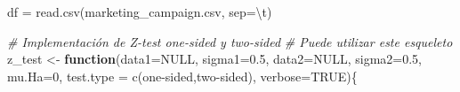 \documentclass[]{article}
\newenvironment{Shaded}{\begin{snugshade}}{\end{snugshade}}
\newcommand{\AttributeTok}[1]{\textcolor[rgb]{0.77,0.63,0.00}{#1}}
\newcommand{\CommentTok}[1]{\textcolor[rgb]{0.56,0.35,0.01}{\textit{#1}}}
\newcommand{\ConstantTok}[1]{\textcolor[rgb]{0.00,0.00,0.00}{#1}}
\newcommand{\ControlFlowTok}[1]{\textcolor[rgb]{0.13,0.29,0.53}{\textbf{#1}}}
\newcommand{\DecValTok}[1]{\textcolor[rgb]{0.00,0.00,0.81}{#1}}
\newcommand{\FloatTok}[1]{\textcolor[rgb]{0.00,0.00,0.81}{#1}}
\newcommand{\FunctionTok}[1]{\textcolor[rgb]{0.00,0.00,0.00}{#1}}
\newcommand{\NormalTok}[1]{#1}
\newcommand{\OtherTok}[1]{\textcolor[rgb]{0.56,0.35,0.01}{#1}}
\newcommand{\SpecialCharTok}[1]{\textcolor[rgb]{0.00,0.00,0.00}{#1}}
\newcommand{\StringTok}[1]{\textcolor[rgb]{0.31,0.60,0.02}{#1}}
\begin{document}
\begin{Shaded}
\begin{Highlighting}[]
\NormalTok{df }\OtherTok{=} \FunctionTok{read.csv}\NormalTok{(}\StringTok{\textquotesingle{}marketing\_campaign.csv\textquotesingle{}}\NormalTok{, }\AttributeTok{sep=}\StringTok{\textquotesingle{}}\SpecialCharTok{\textbackslash{}t}\StringTok{\textquotesingle{}}\NormalTok{)}

\CommentTok{\# Implementación de Z{-}test one{-}sided y two{-}sided}
\CommentTok{\# Puede utilizar este esqueleto}
\NormalTok{z\_test }\OtherTok{\textless{}{-}} \ControlFlowTok{function}\NormalTok{(}\AttributeTok{data1=}\ConstantTok{NULL}\NormalTok{, }\AttributeTok{sigma1=}\FloatTok{0.5}\NormalTok{, }\AttributeTok{data2=}\ConstantTok{NULL}\NormalTok{, }\AttributeTok{sigma2=}\FloatTok{0.5}\NormalTok{, }
                   \AttributeTok{mu.Ha=}\DecValTok{0}\NormalTok{, }\AttributeTok{test.type =} \FunctionTok{c}\NormalTok{(}\StringTok{\textquotesingle{}one{-}sided\textquotesingle{}}\NormalTok{,}\StringTok{\textquotesingle{}two{-}sided\textquotesingle{}}\NormalTok{),}
                   \AttributeTok{verbose=}\ConstantTok{TRUE}\NormalTok{)\{}
  

\end{Highlighting}
\end{Shaded}
\end{document}
